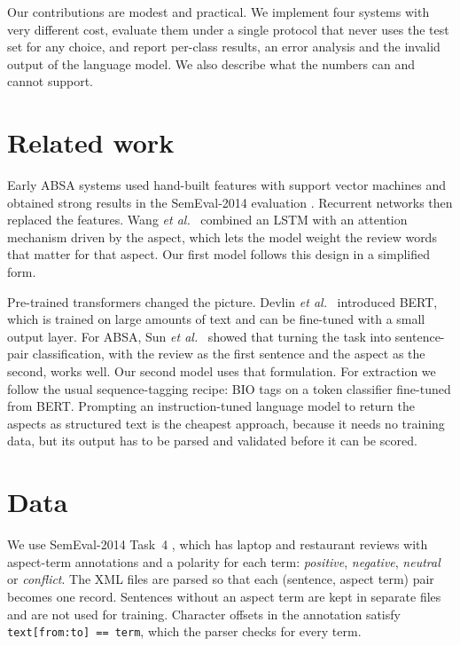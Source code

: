\documentclass{nle}
\begin{document}
Our contributions are modest and practical. We implement four systems with very different cost, evaluate them under a single protocol that never uses the test set for any choice, and report per-class results, an error analysis and the invalid output of the language model. We also describe what the numbers can and cannot support.

\section{Related work}

Early ABSA systems used hand-built features with support vector machines and obtained strong results in the SemEval-2014 evaluation \cite{pontiki2014}. Recurrent networks then replaced the features. Wang \textit{et al.}\  combined an LSTM with an attention mechanism driven by the aspect, which lets the model weight the review words that matter for that aspect. Our first model follows this design in a simplified form.

Pre-trained transformers changed the picture. Devlin \textit{et al.}\  introduced BERT, which is trained on large amounts of text and can be fine-tuned with a small output layer. For ABSA, Sun \textit{et al.}\  showed that turning the task into sentence-pair classification, with the review as the first sentence and the aspect as the second, works well. Our second model uses that formulation. For extraction we follow the usual sequence-tagging recipe: BIO tags on a token classifier fine-tuned from BERT. Prompting an instruction-tuned language model to return the aspects as structured text is the cheapest approach, because it needs no training data, but its output has to be parsed and validated before it can be scored.

\section{Data}

We use SemEval-2014 Task~4 \cite{pontiki2014}, which has laptop and restaurant reviews with aspect-term annotations and a polarity for each term: \textit{positive}, \textit{negative}, \textit{neutral} or \textit{conflict}. The XML files are parsed so that each (sentence, aspect term) pair becomes one record. Sentences without an aspect term are kept in separate files and are not used for training. Character offsets in the annotation satisfy \texttt{text[from:to] == term}, which the parser checks for every term.
\end{document}

